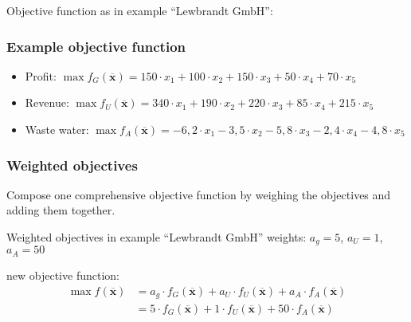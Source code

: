 \begin{frame}
 Objective function as in example ``Lewbrandt GmbH'':
 \frametitle{Example objective function}
 \begin{itemize}
  \item Profit: $\max f_G(\mathbf{\overline{x}}) = 150\cdot x_1 + 100\cdot x_2 + 150\cdot x_3 + 50\cdot x_4 + 70\cdot x_5$
  \item Revenue: $\max f_U(\mathbf{\overline{x}}) = 340\cdot x_1 + 190\cdot x_2 + 220\cdot x_3 + 85\cdot x_4 + 215\cdot x_5$
  \item Waste water: $\max f_A(\mathbf{\overline{x}}) = -6,2\cdot x_1 - 3,5\cdot x_2 - 5,8\cdot x_3 - 2,4\cdot x_4 - 4,8\cdot x_5$
 \end{itemize}
\end{frame}

\begin{frame}
 \frametitle{Weighted objectives}
 Compose \alert{one} comprehensive objective function by weighing the objectives and adding them together.
 
 \begin{block}{Weighted objectives in example ``Lewbrandt GmbH'' }
  weights: $a_g=5$, $a_U=1$, $a_A=50$\par
  new objective function: 
  \[
  \begin{split}
  \max f(\mathbf{\overline{x}}) &= a_g\cdot f_G(\mathbf{\overline{x}}) + a_U\cdot f_U(\mathbf{\overline{x}})+a_A\cdot f_A(\mathbf{\overline{x}})\\
  &=5\cdot f_G(\mathbf{\overline{x}}) + 1\cdot f_U(\mathbf{\overline{x}})+50\cdot f_A(\mathbf{\overline{x}})
  \end{split}
  \]
 \end{block}
\end{frame}

